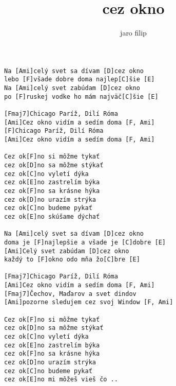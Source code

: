 \author{jaro filip}
\title{cez okno}
\maketitle
\begin{verbatim}
Na [Ami]celý svet sa dívam [D]cez okno
lebo [F]všade dobre doma najlep[C]šie [E]
Na [Ami]celý svet zabúdam [D]cez okno
po [F]ruskej vodke ho mám najväč[C]šie [E]

[Fmaj7]Chicago Paríž, Dilí Róma
[Ami]Cez okno vidím a sedím doma [F, Ami]
[F]Chicago Paríž, Dilí Róma
[Ami]Cez okno vidím a sedím doma [F, Ami]

Cez ok[F]no si môžme tykať
cez ok[D]no sa môžme stýkať
cez ok[C]no vyletí dýka
cez ok[E]no zastrelím býka
cez ok[F]no sa krásne hýka
cez ok[D]no urazím strýka
cez ok[C]no budeme pykať
cez ok[E]no skúšame dýchať

Na [Ami]celý svet sa dívam [D]cez okno
doma je [F]najlepšie a všade je [C]dobre [E]
[Ami]Celý svet zabúdam [D]cez okno
každý to [F]okno odo mňa žo[C]bre [E]

[Fmaj7]Chicago Paríž, Dilí Róma
[Ami]Cez okno vidím a sedím doma [F, Ami]
[Fmaj7]Čechov, Maďarov a svet dindov
[Ami]pozorne sledujem cez svoj Window [F, Ami]

Cez ok[F]no si môžme tykať
cez ok[D]no sa môžme stýkať
cez ok[C]no vyletí dýka
cez ok[E]no zastrelím býka
cez ok[F]no sa krásne hýka
cez ok[D]no urazím strýka
cez ok[C]no budeme pykať
cez ok[E]no mi môžeš vieš čo ..  
\end{verbatim}